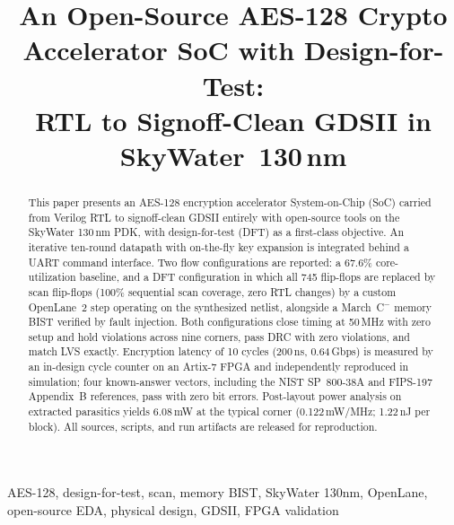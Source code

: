 \documentclass[conference]{IEEEtran}
\begin{document}
\title{An Open-Source AES-128 Crypto Accelerator SoC with Design-for-Test:\\
RTL to Signoff-Clean GDSII in SkyWater~130\,nm}

\author{
}

\maketitle

\begin{abstract}
This paper presents an AES-128 encryption accelerator System-on-Chip (SoC)
carried from Verilog RTL to signoff-clean GDSII entirely with open-source
tools on the SkyWater 130\,nm PDK, with design-for-test (DFT) as a first-class
objective. An iterative ten-round datapath with on-the-fly key expansion is
integrated behind a UART command interface. Two flow configurations are
reported: a 67.6\% core-utilization baseline, and a DFT configuration in
which all 745 flip-flops are replaced by scan flip-flops (100\% sequential
scan coverage, zero RTL changes) by a custom OpenLane~2 step operating on the
synthesized netlist, alongside a March~C$^-$ memory BIST verified by fault
injection. Both configurations close timing at 50\,MHz with zero setup and
hold violations across nine corners, pass DRC with zero violations, and match
LVS exactly. Encryption latency of 10 cycles (200\,ns, 0.64\,Gbps) is
measured by an in-design cycle counter on an Artix-7 FPGA and independently
reproduced in simulation; four known-answer vectors, including the NIST
SP~800-38A and FIPS-197 Appendix~B references, pass with zero bit errors.
Post-layout power analysis on extracted parasitics yields 6.08\,mW at the
typical corner (0.122\,mW/MHz; 1.22\,nJ per block). All sources, scripts, and
run artifacts are released for reproduction.
\end{abstract}

\begin{IEEEkeywords}
AES-128, design-for-test, scan, memory BIST, SkyWater 130nm, OpenLane,
open-source EDA, physical design, GDSII, FPGA validation
\end{IEEEkeywords}
\end{document}
